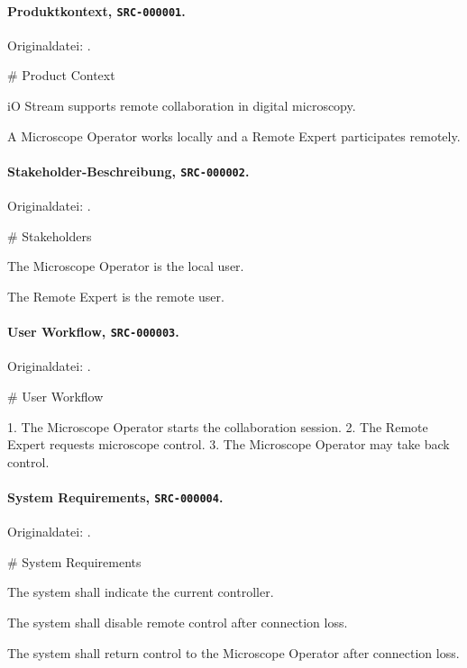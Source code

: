 \paragraph{Produktkontext, \texttt{SRC-000001}.}
Originaldatei: .

\begin{evidencebox}
# Product Context

iO Stream supports remote collaboration in digital microscopy.

A Microscope Operator works locally and a Remote Expert participates remotely.
\end{evidencebox}

\paragraph{Stakeholder-Beschreibung, \texttt{SRC-000002}.}
Originaldatei: .

\begin{evidencebox}
# Stakeholders

The Microscope Operator is the local user.

The Remote Expert is the remote user.
\end{evidencebox}

\paragraph{User Workflow, \texttt{SRC-000003}.}
Originaldatei: .

\begin{evidencebox}
# User Workflow

1. The Microscope Operator starts the collaboration session.
2. The Remote Expert requests microscope control.
3. The Microscope Operator may take back control.
\end{evidencebox}

\paragraph{System Requirements, \texttt{SRC-000004}.}
Originaldatei: .

\begin{evidencebox}
# System Requirements

The system shall indicate the current controller.

The system shall disable remote control after connection loss.

The system shall return control to the Microscope Operator after connection loss.
\end{evidencebox}

